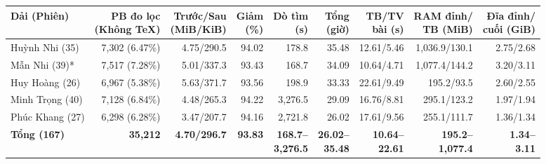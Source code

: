 \begin{table}[htbp]
    \centering
    \scriptsize
    \setlength{\tabcolsep}{2.5pt}
    \renewcommand{\arraystretch}{1.24}
    \begin{tabular*}{\textwidth}{@{\extracolsep{\fill}}l r r r r r r r r@{}}
        \toprule
        \textbf{Dải (Phiên)} &
        \shortstack[r]{\textbf{PB đo lọc}\\\textbf{(Không TeX)}} &
        \shortstack[r]{\textbf{Trước/Sau}\\\textbf{(MiB/KiB)}} &
        \shortstack[r]{\textbf{Giảm}\\\textbf{(\%)}} &
        \shortstack[r]{\textbf{Dò tìm}\\\textbf{(s)}} &
        \shortstack[r]{\textbf{Tổng}\\\textbf{(giờ)}} &
        \shortstack[r]{\textbf{TB/TV}\\\textbf{bài (s)}} &
        \shortstack[r]{\textbf{RAM đỉnh/}\\\textbf{TB (MiB)}} &
        \shortstack[r]{\textbf{Đĩa đỉnh/}\\\textbf{cuối (GiB)}} \\
        \midrule
        Huỳnh Nhi (35) & 7,302 (6.47\%) & 4.75/290.5 & 94.02 & 178.8 & 35.48 & 12.61/5.46 & 1,036.9/130.1 & 2.75/2.68 \\
        Mẫn Nhi (39)* & 7,517 (7.28\%) & 5.01/337.3 & 93.43 & 168.7 & 34.09 & 10.64/4.71 & 1,077.4/144.2 & 3.20/3.11 \\
        Huy Hoàng (26) & 6,967 (5.38\%) & 5.63/371.7 & 93.56 & 198.9 & 33.33 & 22.61/9.49 & 195.2/93.5 & 2.60/2.55 \\
        Minh Trọng (40) & 7,128 (6.84\%) & 4.48/265.3 & 94.22 & 3,276.5 & 29.09 & 16.76/8.81 & 295.1/123.2 & 1.97/1.94 \\
        Phúc Khang (27) & 6,298 (6.28\%) & 3.47/207.7 & 94.16 & 2,721.8 & 26.02 & 17.61/9.56 & 255.1/111.7 & 1.36/1.34 \\
        \midrule
        \textbf{Tổng (167)} &
        \textbf{35,212} &
        \textbf{4.70/296.7} &
        \textbf{93.83} &
        \shortstack[r]{\textbf{168.7--}\\\textbf{3,276.5}} &
        \shortstack[r]{\textbf{26.02--}\\\textbf{35.48}} &
        \shortstack[r]{\textbf{10.64--}\\\textbf{22.61}} &
        \shortstack[r]{\textbf{195.2--}\\\textbf{1,077.4}} &
        \shortstack[r]{\textbf{1.34--}\\\textbf{3.11}} \\

\end{tabular*}
\end{table}
